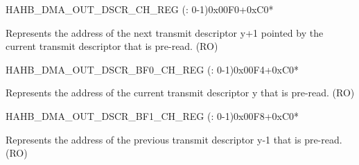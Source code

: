 \begin{register}{H}{AHB\_DMA\_OUT\_DSCR\_CH\_REG (: 0-1)}{0x00F0+0xC0*}\label{regdesc:AHBDMAOUTDSCRCHNREG}
%
\regnewline%
\begin{regdesc}\begin{reglist}
\label{fielddesc:AHBDMAOUTLINKDSCRCHN}\item [AHB\_DMA\_OUTLINK\_DSCR\_CH\regindex{n}] Represents the address of the next transmit descriptor y+1 pointed by the current transmit descriptor that is pre-read. (RO)
\end{reglist}\end{regdesc}
\end{register}


\begin{register}{H}{AHB\_DMA\_OUT\_DSCR\_BF0\_CH\_REG (: 0-1)}{0x00F4+0xC0*}\label{regdesc:AHBDMAOUTDSCRBF0CHNREG}
%
\regnewline%
\begin{regdesc}\begin{reglist}
\label{fielddesc:AHBDMAOUTLINKDSCRBF0CHN}\item [AHB\_DMA\_OUTLINK\_DSCR\_BF0\_CH\regindex{n}] Represents the address of the current transmit descriptor y that is pre-read. (RO)
\end{reglist}\end{regdesc}
\end{register}


\begin{register}{H}{AHB\_DMA\_OUT\_DSCR\_BF1\_CH\_REG (: 0-1)}{0x00F8+0xC0*}\label{regdesc:AHBDMAOUTDSCRBF1CHNREG}
%
\regnewline%
\begin{regdesc}\begin{reglist}
\label{fielddesc:AHBDMAOUTLINKDSCRBF1CHN}\item [AHB\_DMA\_OUTLINK\_DSCR\_BF1\_CH\regindex{n}] Represents the address of the previous transmit descriptor y-1 that is pre-read. (RO)
\end{reglist}\end{regdesc}
\end{register}


